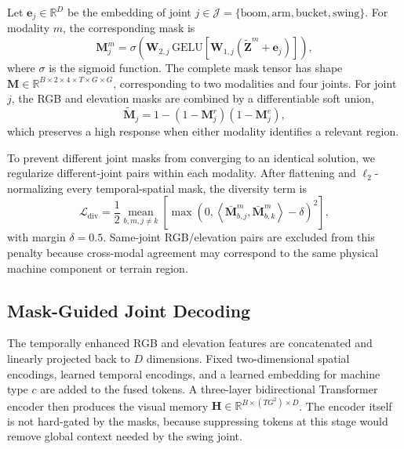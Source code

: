 \documentclass[journal]{IEEEtran}
\begin{document}
Let $\mathbf{e}_{j}\in\mathbb{R}^{D}$ be the embedding of joint
$j\in\mathcal{J}=\{\text{boom},\text{arm},\text{bucket},\text{swing}\}$.
For modality $m$, the corresponding mask is
\begin{equation}
\mathbf{M}^{m}_{j}=
\sigma\!\left(
\mathbf{W}_{2,j}\,\mathrm{GELU}\!\left[
\mathbf{W}_{1,j}\left(\widetilde{\mathbf{Z}}^{m}+\mathbf{e}_{j}\right)
\right]\right),
\label{eq:mask_generation}
\end{equation}
where $\sigma$ is the sigmoid function. The complete mask tensor has shape
$\mathbf{M}\in\mathbb{R}^{B\times2\times4\times T\times G\times G}$,
corresponding to two modalities and four joints. For joint $j$, the RGB and
elevation masks are combined by a differentiable soft union,
\begin{equation}
\widetilde{\mathbf{M}}_{j}=
1-\left(1-\mathbf{M}^{r}_{j}\right)
  \left(1-\mathbf{M}^{e}_{j}\right),
\label{eq:mask_union}
\end{equation}
which preserves a high response when either modality identifies a relevant
region.

To prevent different joint masks from converging to an identical solution,
we regularize different-joint pairs within each modality. After flattening
and $\ell_2$-normalizing every temporal-spatial mask, the diversity term is
\begin{equation}
\mathcal{L}_{\mathrm{div}}=
\frac{1}{2}\underset{b,m,j\neq k}{\operatorname{mean}}
\left[\max\!\left(0,
\left\langle\bar{\mathbf{M}}^{m}_{b,j},
\bar{\mathbf{M}}^{m}_{b,k}\right\rangle-\delta\right)^{2}\right],
\label{eq:diversity}
\end{equation}
with margin $\delta=0.5$. Same-joint RGB/elevation pairs are excluded from
this penalty because cross-modal agreement may correspond to the same physical
machine component or terrain region.

\subsection{Mask-Guided Joint Decoding}
\label{subsec:decoder}

The temporally enhanced RGB and elevation features are concatenated and
linearly projected back to $D$ dimensions. Fixed two-dimensional spatial
encodings, learned temporal encodings, and a learned embedding for machine
type $c$ are added to the fused tokens. A three-layer bidirectional Transformer
encoder then produces the visual memory
$\mathbf{H}\in\mathbb{R}^{B\times(TG^{2})\times D}$. The encoder itself is
not hard-gated by the masks, because suppressing tokens at this stage would
remove global context needed by the swing joint.
\end{document}
